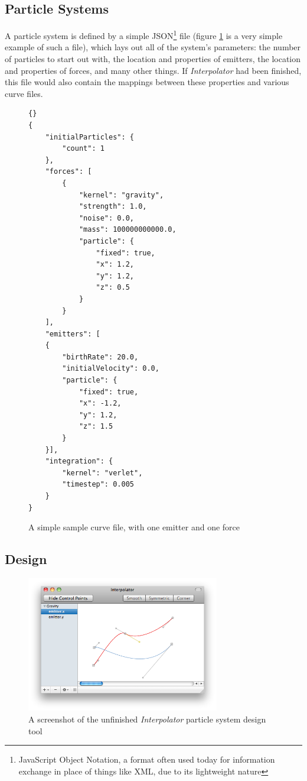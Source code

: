 \documentclass{acmsiggraph}
\begin{document}
\subsection{Particle Systems}

A particle system is defined by a simple JSON\footnote{JavaScript Object Notation, a format often used today for information exchange in place of things like XML, due to its lightweight nature} file (figure \ref{curveListing} is a very simple example of such a file), which lays out all of the system's parameters: the number of particles to start out with, the location and properties of emitters, the location and properties of forces, and many other things. If {\it Interpolator} had been finished, this file would also contain the mappings between these properties and various curve files.

\begin{figure}

    \lstset{language=Python}
    \lstset{basicstyle=\footnotesize\ttfamily}
    \begin{lstlisting}[frame=trbl]{}
{
    "initialParticles": {
        "count": 1
    },
    "forces": [
        {
            "kernel": "gravity",
            "strength": 1.0,
            "noise": 0.0,
            "mass": 100000000000.0,
            "particle": {
                "fixed": true,
                "x": 1.2,
                "y": 1.2,
                "z": 0.5
            }
        }
    ],
    "emitters": [
    {
        "birthRate": 20.0,
        "initialVelocity": 0.0,
        "particle": {
            "fixed": true,
            "x": -1.2,
            "y": 1.2,
            "z": 1.5
        }
    }],
    "integration": {
        "kernel": "verlet",
        "timestep": 0.005
    }
}
    \end{lstlisting}

    \caption{A simple sample curve file, with one emitter and one force}
    \label{curveListing}
\end{figure}

\subsection{Design}

\begin{figure}
    \includegraphics[width=84.5mm]{interpolator.png}
    \caption{A screenshot of the unfinished {\it Interpolator} particle system design tool}
    \label{fig:interpolator}
\end{figure}
\end{document}
